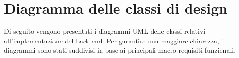 \section{Diagramma delle classi di design}

Di seguito vengono presentati i diagrammi UML delle classi relativi all’implementazione del
back-end. Per garantire una maggiore chiarezza, i diagrammi sono stati suddivisi in base ai
principali macro-requisiti funzionali.

